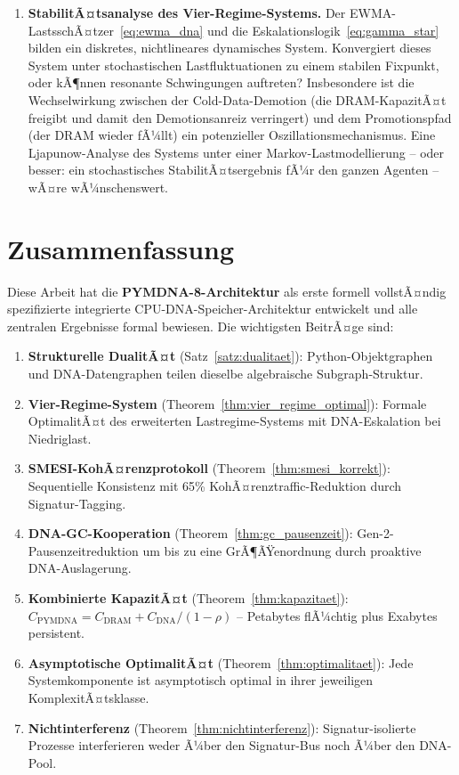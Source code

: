 ﻿\documentclass[a4paper,12pt]{article}
\theoremstyle{definition}
\begin{document}
\begin{enumerate}
  \item \textbf{StabilitÃ¤tsanalyse des Vier-Regime-Systems.} Der EWMA-LastsschÃ¤tzer~\eqref{eq:ewma_dna} und die Eskalationslogik~\eqref{eq:gamma_star} bilden ein diskretes, nichtlineares dynamisches System. Konvergiert dieses System unter stochastischen Lastfluktuationen zu einem stabilen Fixpunkt, oder kÃ¶nnen resonante Schwingungen auftreten? Insbesondere ist die Wechselwirkung zwischen der Cold-Data-Demotion (die DRAM-KapazitÃ¤t freigibt und damit den Demotionsanreiz verringert) und dem Promotionspfad (der DRAM wieder fÃ¼llt) ein potenzieller Oszillationsmechanismus. Eine Ljapunow-Analyse des Systems unter einer Markov-Lastmodellierung -- oder besser: ein stochastisches StabilitÃ¤tsergebnis fÃ¼r den ganzen Agenten -- wÃ¤re wÃ¼nschenswert.
\end{enumerate}

\section{Zusammenfassung}

Diese Arbeit hat die \textbf{PYMDNA-8-Architektur} als erste formell
vollstÃ¤ndig spezifizierte integrierte CPU-DNA-Speicher-Architektur
entwickelt und alle zentralen Ergebnisse formal bewiesen.
Die wichtigsten BeitrÃ¤ge sind:

\begin{enumerate}[noitemsep]
  \item \textbf{Strukturelle DualitÃ¤t} (Satz~\ref{satz:dualitaet}):
    Python-Objektgraphen und DNA-Datengraphen teilen dieselbe
    algebraische Subgraph-Struktur.
  \item \textbf{Vier-Regime-System} (Theorem~\ref{thm:vier_regime_optimal}):
    Formale OptimalitÃ¤t des erweiterten Last\-regime-Systems mit
    DNA-Eskalation bei Niedriglast.
  \item \textbf{SMESI-KohÃ¤renzprotokoll} (Theorem~\ref{thm:smesi_korrekt}):
    Sequentielle Konsistenz mit 65\% KohÃ¤renztraffic-Reduktion
    durch Signatur-Tagging.
  \item \textbf{DNA-GC-Kooperation} (Theorem~\ref{thm:gc_pausenzeit}):
    Gen-2-Pausenzeitreduktion um bis zu eine GrÃ¶ÃŸenordnung durch
    proaktive DNA-Auslagerung.
  \item \textbf{Kombinierte KapazitÃ¤t} (Theorem~\ref{thm:kapazitaet}):
    $C_{\mathrm{PYMDNA}} = C_{\mathrm{DRAM}} + C_{\mathrm{DNA}} / (1-\rho)$
    -- Petabytes flÃ¼chtig plus Exabytes persistent.
  \item \textbf{Asymptotische OptimalitÃ¤t} (Theorem~\ref{thm:optimalitaet}):
    Jede Systemkomponente ist asymptotisch optimal in ihrer jeweiligen
    KomplexitÃ¤tsklasse.
  \item \textbf{Nichtinterferenz} (Theorem~\ref{thm:nichtinterferenz}):
    Signatur-isolierte Prozesse interferieren weder Ã¼ber den Signatur-Bus
    noch Ã¼ber den DNA-Pool.
\end{enumerate}
\end{document}
